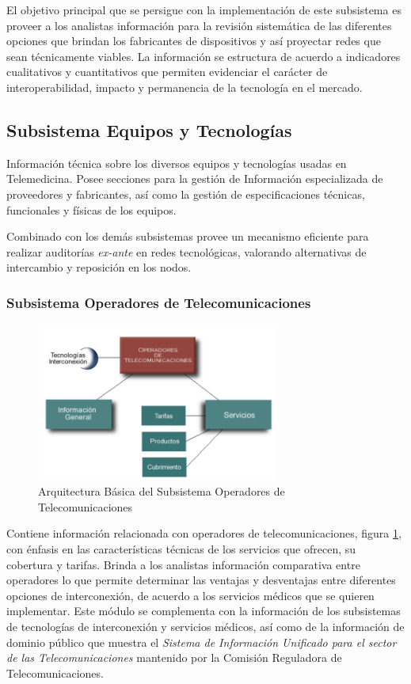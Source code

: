 El objetivo principal que se persigue con la implementación de este subsistema es proveer a los analistas información para la revisión sistemática de las diferentes opciones que brindan los fabricantes de dispositivos y así proyectar redes que sean técnicamente viables. La información se estructura de acuerdo a indicadores cualitativos y cuantitativos que permiten evidenciar el carácter de interoperabilidad, impacto y permanencia de la tecnología en el mercado. 

\subsection{Subsistema Equipos y Tecnologías}
Información técnica sobre los diversos equipos y tecnologías usadas en Telemedicina. Posee secciones para la gestión de Información especializada de proveedores y fabricantes, así como la gestión de especificaciones técnicas, funcionales y físicas de los equipos.

Combinado con los demás subsistemas provee un mecanismo eficiente para realizar auditorías \textit{ex-ante} en redes tecnológicas, valorando alternativas de intercambio y reposición en los nodos.

\subsubsection{Subsistema Operadores de Telecomunicaciones}

\begin{figure}
 \centering
 \includegraphics[width=80mm, height=52mm]{operadores.png}
 \caption{Arquitectura Básica del Subsistema Operadores de Telecomunicaciones}
 \label{operadores}
\end{figure}

Contiene información relacionada con operadores de telecomunicaciones, figura \ref{operadores}, con énfasis en las características técnicas de los servicios que ofrecen, su cobertura y tarifas. Brinda a los analistas información comparativa entre operadores lo que permite determinar las ventajas y desventajas entre diferentes opciones de interconexión, de acuerdo a los servicios médicos que se quieren implementar. Este módulo se complementa con la información de los subsistemas de tecnologías de interconexión y servicios médicos, así como de la información de dominio público que muestra el \textit{Sistema de Información Unificado para el sector de las Telecomunicaciones} mantenido por la Comisión Reguladora de Telecomunicaciones.

